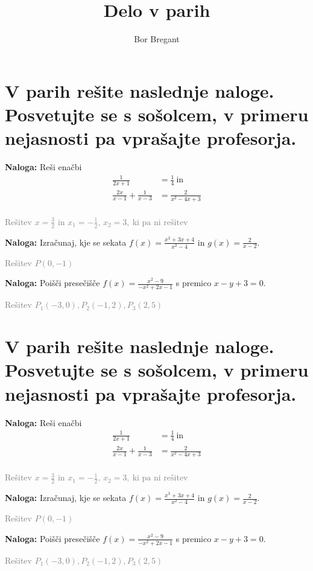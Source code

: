 \documentclass{article}
\title{Delo v parih}
\author{Bor Bregant}
\date{\vspace{-5ex}}
\newcounter{example}[section]
\newenvironment{example}[1][]{\par\medskip
   \noindent \textbf{Naloga:} \rmfamily}{\medskip}
\begin{document}
\section*{V parih rešite naslednje naloge. Posvetujte se s sošolcem, v primeru nejasnosti pa vprašajte profesorja.}


\begin{example}
    Reši enačbi
    \begin{align*}
        \frac{1}{2x+1}&=\frac{1}{4} \ \text{in}\\
        \frac{2x}{x-1}+\frac{1}{x-3}&=\frac{2}{x^2-4x+3}\\
    \end{align*}
\end{example}

\textcolor{gray}{Rešitev $x=\frac{3}{2}$ in $x_1 = -\frac{1}{2},\, x_2=3,\ \text{ki pa ni rešitev}$}

\begin{example}
    Izračunaj, kje se sekata $f(x)=\frac{x^3+3x+4}{x^2-4}$ in $g(x)=\frac{2}{x-2}$.
\end{example}

\textcolor{gray}{Rešitev $P(0,-1)$}

\begin{example}
    Poišči presečišče $f(x)=\frac{x^2-9}{-x^2+2x-1}$ s premico $x-y+3=0$.
\end{example}

\textcolor{gray}{Rešitev $P_1 (-3,0), P_2(-1,2), P_3(2,5)$}

\section*{V parih rešite naslednje naloge. Posvetujte se s sošolcem, v primeru nejasnosti pa vprašajte profesorja.}


\begin{example}
    Reši enačbi
    \begin{align*}
        \frac{1}{2x+1}&=\frac{1}{4} \ \text{in}\\
        \frac{2x}{x-1}+\frac{1}{x-3}&=\frac{2}{x^2-4x+3}\\
    \end{align*}
\end{example}
    
\textcolor{gray}{Rešitev $x=\frac{3}{2}$ in $x_1 = -\frac{1}{2},\, x_2=3,\ \text{ki pa ni rešitev}$}

\begin{example}
    Izračunaj, kje se sekata $f(x)=\frac{x^3+3x+4}{x^2-4}$ in $g(x)=\frac{2}{x-2}$.
\end{example}

\textcolor{gray}{Rešitev $P(0,-1)$}

\begin{example}
    Poišči presečišče $f(x)=\frac{x^2-9}{-x^2+2x-1}$ s premico $x-y+3=0$.
\end{example}

\textcolor{gray}{Rešitev $P_1 (-3,0), P_2(-1,2), P_3(2,5)$}
\end{document}
